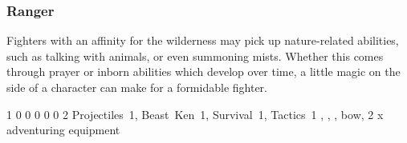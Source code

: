 {\begin{multicols}{2}
\subsubsection{Ranger}

Fighters with an affinity for the wilderness may pick up nature-related abilities, such as talking with animals, or even summoning mists.
Whether this comes through prayer or inborn abilities which develop over time, a little magic on the side of a character can make for a formidable fighter.


{1}%
{0}%
{{0}%
{0}%
{0}}%
{0}%
{2}%
{Projectiles~1, Beast~Ken~1, Survival~1, Tactics~1\knacks{\mightydraw, \charge}}%
{\longsword, \partialchain, \bucklar, bow, 2 x adventuring equipment}%
{\addtocounter{fp}{10}}

\end{multicols}

}{}

